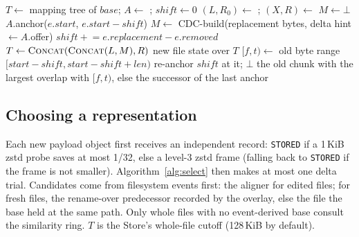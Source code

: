 \begin{algorithm}[h]
\caption{Apply localized edits to a chunked file}
\label{alg:edit}
\small
\begin{algorithmic}[1]
  \State $T \gets$ mapping tree of $\mathit{base}$; $A \gets$ ; $\mathit{shift} \gets 0$
    \State $(L, R_0) \gets$ ; $(X, R) \gets$  
    \State $M \gets \bot$
      \State $A$.anchor($e.\mathit{start}$, $e.\mathit{start} - \mathit{shift}$)
      \State $M \gets$ CDC-build(replacement bytes, delta hint $\gets A$.offer)
    \EndIf
    \State $\mathit{shift} \mathrel{+}= e.\mathit{replacement} - e.\mathit{removed}$
    \State $T \gets \textsc{Concat}(\textsc{Concat}(L, M), R)$ 
  \EndFor
  \State \Return new file state over $T$
\EndFunction
\Statex
{} 
  \State $[f, t) \gets$ old byte range $[\mathit{start} - \mathit{shift}, \mathit{start} - \mathit{shift} + \mathit{len})$
    \State re-anchor $\mathit{shift}$ at it; \Return $\bot$ 
  \EndIf
  \State \Return the old chunk with the largest overlap with $[f, t)$, else the successor of the last anchor
\EndFunction
\end{algorithmic}
\end{algorithm}

\subsection{Choosing a representation}

Each new payload object first receives an independent record: \texttt{STORED} if a
1\,KiB zstd probe saves at most 1/32, else a level-3 zstd frame (falling back to
\texttt{STORED} if the frame is not smaller). Algorithm~\ref{alg:select} then makes at
most one delta trial. Candidates come from filesystem events first: the aligner for
edited files; for fresh files, the rename-over predecessor recorded by the overlay, else
the file the base held at the same path. Only whole files with no event-derived base
consult the similarity ring. $T$ is the Store's whole-file cutoff (128\,KiB by default).

